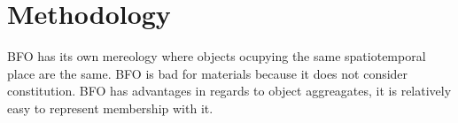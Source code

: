 ﻿\section{Methodology}

BFO has its own mereology where objects ocupying the same spatiotemporal place
are the same. BFO is bad for materials because it does not consider constitution.
BFO has advantages in regards to object aggreagates, it is relatively easy to represent
membership with it. 